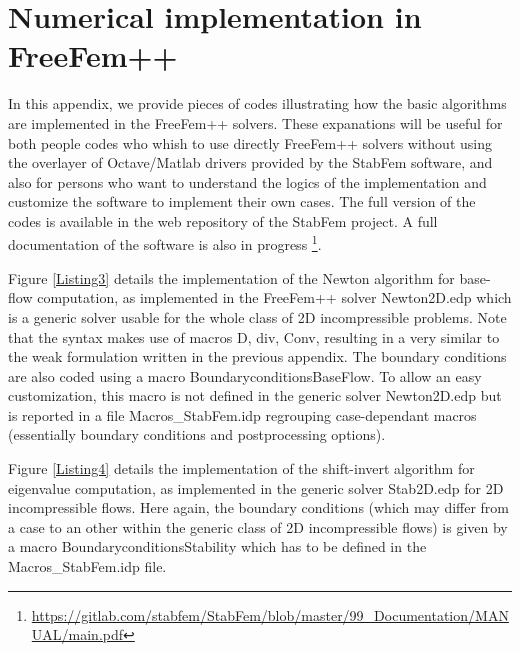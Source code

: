 \documentclass[twocolumn,10pt]{asme2ej}
\begin{document}
\begin{figure*}[t]
\small

 \normalsize
\caption{Illustration of the implementation of the shift-invert algorithm for single eigenmode computation (extract from FreeFem++ program {\sf  Stab2D.edp}).}
\label{Listing4}
\end{figure*}


\section{Numerical implementation in FreeFem++}

In this appendix, we provide pieces of codes illustrating how the basic algorithms are implemented in the FreeFem++ solvers. These expanations will be useful for both people codes who whish to use directly FreeFem++ solvers without using the overlayer of Octave/Matlab drivers provided by the StabFem software, and also for persons who want to understand the logics of the implementation and customize the software to implement their own cases. The full version of the codes is available in the web repository of the StabFem project. A full documentation of the software is also in progress \footnote{\url{https://gitlab.com/stabfem/StabFem/blob/master/99_Documentation/MANUAL/main.pdf}}.

Figure \ref{Listing3} details the implementation of the Newton algorithm for base-flow computation, as implemented in the FreeFem++ solver {\sf  Newton2D.edp} which is a generic solver usable for the whole class of 2D incompressible problems. Note that the syntax makes use of macros {\sf  D, div, Conv}, resulting in a very similar to the weak formulation written in the previous appendix. The boundary conditions are also coded using a macro {\sf  BoundaryconditionsBaseFlow}. To allow an easy customization, this macro is not defined in the generic solver {\sf  Newton2D.edp} but is reported in a file {\sf  Macros\_StabFem.idp} regrouping case-dependant macros (essentially boundary conditions and postprocessing options).

Figure \ref{Listing4} details the implementation of the shift-invert algorithm for eigenvalue computation, as implemented in the generic solver {\sf  Stab2D.edp} for 2D incompressible flows.  Here again, the boundary conditions (which may differ from a case to an other within the generic class of 2D incompressible flows) is given by a macro {\sf  BoundaryconditionsStability} which has to be defined in the  {\sf  Macros\_StabFem.idp} file.
\end{document}
